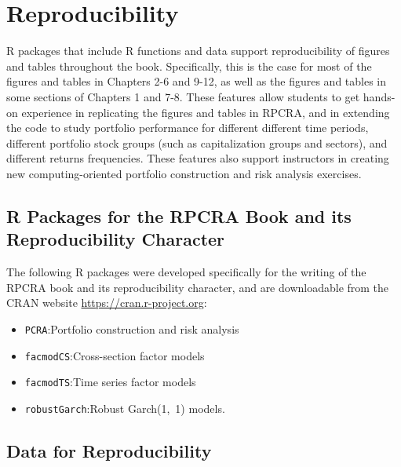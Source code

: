 \documentclass[graybox,envcountchap,sectrefs]{svmono}\usepackage[]{graphicx}\usepackage[]{xcolor}
\begin{document}
\section*{Reproducibility}

R packages that include R functions and data support reproducibility
of figures and tables throughout the book. Specifically, this is the
case for most of the figures and tables in Chapters 2-6 and 9-12,
as well as the figures and tables in some sections of Chapters 1 and
7-8. These features allow students to get hands-on experience in replicating
the figures and tables in RPCRA, and in extending the code to study
portfolio performance for different different time periods, different
portfolio stock groups (such as capitalization groups and sectors),
and different returns frequencies. These features also support instructors
in creating new computing-oriented portfolio construction and risk
analysis exercises.

\subsection*{R Packages for the RPCRA Book and its Reproducibility Character}

The following R packages were developed specifically for the writing
of the RPCRA book and its reproducibility character, and are downloadable
from the CRAN website \url{https://cran.r-project.org}:
\begin{itemize}
\item \texttt{PCRA}:\quad{}Portfolio construction and risk analysis
\item \texttt{facmodCS}:\quad{}Cross-section factor models
\item \texttt{facmodTS}:\quad{}Time series factor models
\item \texttt{robustGarch}:\quad{}Robust Garch(1,\ 1) models.
\end{itemize}

\subsection*{Data for Reproducibility}
\end{document}
